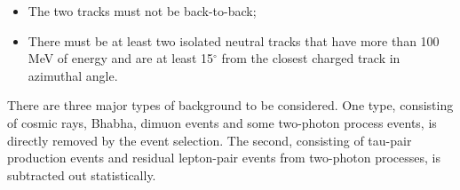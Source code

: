 \begin{itemize}
\item The two tracks must not be back-to-back;


\item There must be at least two isolated neutral tracks that have
more than 100 MeV of energy and are at least 15$^{\circ}$ from the
closest charged track in azimuthal angle.


\end{itemize}





There are three major types of background to be considered.  One type,
consisting of cosmic rays, Bhabha, dimuon events and some two-photon
process events, is directly removed by the event selection.
The second, consisting of tau-pair production events and residual
lepton-pair events from two-photon processes, is subtracted out statistically.

